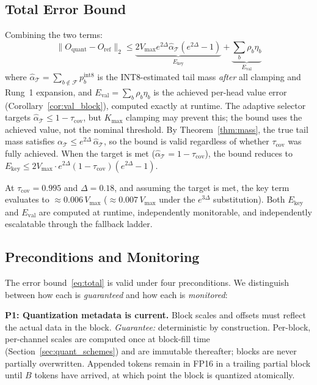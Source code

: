 \documentclass[10pt,twocolumn,a4paper]{article}
\theoremstyle{definition}
\theoremstyle{remark}
\newcommand{\norm}[1]{\lVert #1 \rVert}
\begin{document}
\subsection{Total Error Bound}

Combining the two terms:
\begin{equation}
\label{eq:total}
  \norm{O_{\mathrm{quant}} \!-\! O_{\mathrm{ref}}}_2
  \leq \underbrace{2 V_{\max} e^{2\Delta}\hat{\alpha}_{\mathcal{T}}(e^{2\Delta} \!-\! 1)}_{E_{\mathrm{key}}}
  + \underbrace{\textstyle\sum_b \rho_b\eta_b}_{E_{\mathrm{val}}}
\end{equation}
where $\hat{\alpha}_{\mathcal{T}} = \sum_{b \notin \mathcal{F}} p_b^{\mathrm{int8}}$ is the INT8-estimated tail mass \emph{after} all clamping and Rung~1 expansion, and $E_{\mathrm{val}} = \sum_b \rho_b \eta_b$ is the achieved per-head value error (Corollary~\ref{cor:val_block}), computed exactly at runtime.  The adaptive selector targets $\hat{\alpha}_{\mathcal{T}} \leq 1 - \tau_{\mathrm{cov}}$, but $K_{\max}$ clamping may prevent this; the bound uses the achieved value, not the nominal threshold.  By Theorem~\ref{thm:mass}, the true tail mass satisfies $\alpha_{\mathcal{T}} \leq e^{2\Delta}\,\hat{\alpha}_{\mathcal{T}}$, so the bound is valid regardless of whether $\tau_{\mathrm{cov}}$ was fully achieved.  When the target is met ($\hat{\alpha}_{\mathcal{T}} = 1 - \tau_{\mathrm{cov}}$), the bound reduces to $E_{\mathrm{key}} \leq 2V_{\max} \cdot e^{2\Delta}(1 - \tau_{\mathrm{cov}})(e^{2\Delta} - 1)$.

At $\tau_{\mathrm{cov}} = 0.995$ and $\Delta = 0.18$, and assuming the target is met, the key term evaluates to $\approx 0.006\,V_{\max}$ ($\approx 0.007\,V_{\max}$ under the $e^{3\Delta}$ substitution).  Both $E_{\mathrm{key}}$ and $E_{\mathrm{val}}$ are computed at runtime, independently monitorable, and independently escalatable through the fallback ladder.

\subsection{Preconditions and Monitoring}
\label{sec:preconditions}

The error bound~\eqref{eq:total} is valid under four preconditions.  We distinguish between how each is \emph{guaranteed} and how each is \emph{monitored}:

\textbf{P1: Quantization metadata is current.}  Block scales and offsets must reflect the actual data in the block.  \emph{Guarantee:} deterministic by construction.  Per-block, per-channel scales are computed once at block-fill time (Section~\ref{sec:quant_schemes}) and are immutable thereafter; blocks are never partially overwritten.  Appended tokens remain in FP16 in a trailing partial block until $B$ tokens have arrived, at which point the block is quantized atomically.
\end{document}
